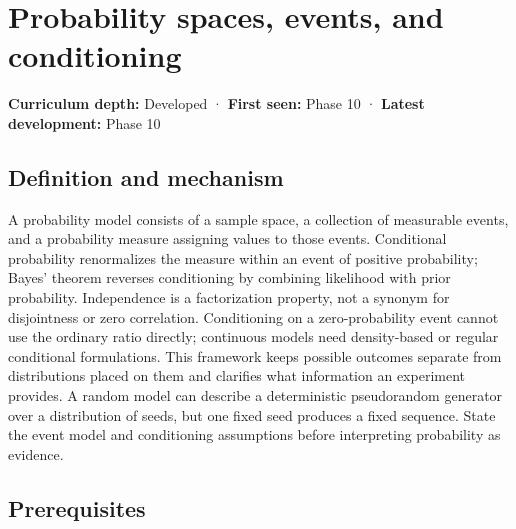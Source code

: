 \hypertarget{appendix-f1ef323f6ed7}{}\label{referencestart:appendix-f1ef323f6ed7}
\section{Probability spaces, events, and conditioning}\label{appendix-f1ef323f6ed7-probability-spaces-events-and-conditioning}

\hypertarget{appendix-f1ef323f6ed7-probability-spaces-events-and-conditioning}{}

\textbf{Curriculum depth:} Developed · \textbf{First seen:} Phase 10 · \textbf{Latest development:} Phase 10

\begin{allmightroledefinition}

\subsection{Definition and mechanism}\label{appendix-f1ef323f6ed7-definition-and-mechanism}

\hypertarget{appendix-f1ef323f6ed7-definition-and-mechanism}{}

A probability model consists of a sample space, a collection of measurable events, and a probability measure assigning values to those events. Conditional probability renormalizes the measure within an event of positive probability; Bayes' theorem reverses conditioning by combining likelihood with prior probability. Independence is a factorization property, not a synonym for disjointness or zero correlation. Conditioning on a zero-probability event cannot use the ordinary ratio directly; continuous models need density-based or regular conditional formulations. This framework keeps possible outcomes separate from distributions placed on them and clarifies what information an experiment provides. A random model can describe a deterministic pseudorandom generator over a distribution of seeds, but one fixed seed produces a fixed sequence. State the event model and conditioning assumptions before interpreting probability as evidence.

\end{allmightroledefinition}

\subsection{Prerequisites}\label{appendix-f1ef323f6ed7-prerequisites}

\hypertarget{appendix-f1ef323f6ed7-prerequisites}{}

